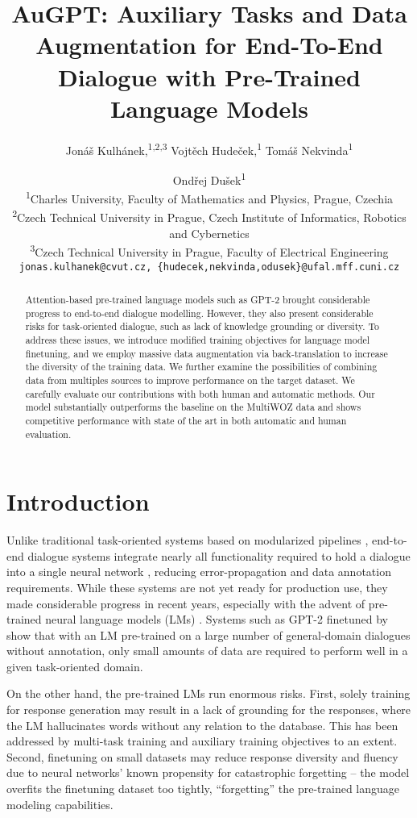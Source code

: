 \documentclass[11pt]{article}
\title{{AuGPT}: {A}uxiliary Tasks and Data Augmentation for End-To-End\\ Dialogue with Pre-Trained Language Models}
\author{Jonáš Kulhánek,\textsuperscript{\rm 1,2,3} Vojtěch Hudeček,\textsuperscript{\rm 1} Tomáš Nekvinda\textsuperscript{\rm 1} \and Ondřej Dušek\textsuperscript{\rm 1} \\
\textsuperscript{\rm 1}Charles University, Faculty of Mathematics and Physics, Prague, Czechia \\
\textsuperscript{\rm 2}Czech Technical University in Prague, Czech Institute of Informatics, Robotics and Cybernetics\\
\textsuperscript{\rm 3}Czech Technical University in Prague, Faculty of Electrical Engineering\\
\texttt{jonas.kulhanek@cvut.cz, \{hudecek,nekvinda,odusek\}@ufal.mff.cuni.cz}
}
\begin{document}
\maketitle
\begin{abstract}
Attention-based pre-trained language models such as GPT-2 brought considerable progress to end-to-end dialogue modelling. However, they also present considerable risks for task-oriented dialogue, such as lack of knowledge grounding or diversity. To address these issues, we introduce modified training objectives for language model finetuning, and we employ massive data augmentation via back-translation to increase the diversity of the training data. We further examine the possibilities of combining data from multiples sources to improve performance on the target dataset. We carefully evaluate our contributions with both human and automatic methods. Our model substantially outperforms the baseline on the MultiWOZ data and shows competitive performance with state of the art in both automatic and human evaluation.
\end{abstract}

\section{Introduction}
Unlike traditional task-oriented systems based on modularized pipelines \cite{young2013, gao2018}, end-to-end dialogue systems integrate nearly all functionality required to hold a dialogue into a single neural network \cite{wen2017,manning2017,lei2018}, reducing error-propagation and data annotation requirements. While these systems are not yet ready for production use, they made considerable progress in recent years, especially with the advent of pre-trained neural language models (LMs) \cite{devlin2019,radford2019,zhang2020dialogpt}.
Systems such as GPT-2 finetuned by \citet{budzianowski2019} show that with an LM pre-trained on a large number of general-domain dialogues without annotation, only small amounts of data are required to perform well in a given task-oriented domain.

On the other hand, the pre-trained LMs run enormous risks. First, solely training for response generation may result in a lack of grounding for the responses, where the LM hallucinates words without any relation to the database. This has been addressed by multi-task training and auxiliary training objectives \cite{peng2020} to an extent. Second, finetuning on small datasets may reduce response diversity and fluency due to neural networks' known propensity for catastrophic forgetting \cite{greco_psycholinguistics_2019} -- the model overfits the finetuning dataset too tightly, “forgetting” the pre-trained language modeling capabilities.
\end{document}
